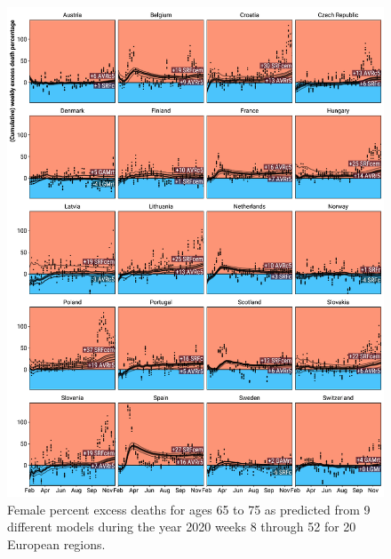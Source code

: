 \documentclass[12pt]{article}
\begin{document}
\begin{appendix}
\begin{figure}
\caption{
Female percent excess deaths for ages 65 to 75 as predicted from 9 different models during the year 2020 weeks 8 through 52 for 20 European regions.}
\label{fig:excessf65to75}
\includegraphics{excess_female__65_75_.pdf}
\end{figure}


\end{appendix}
\end{document}
